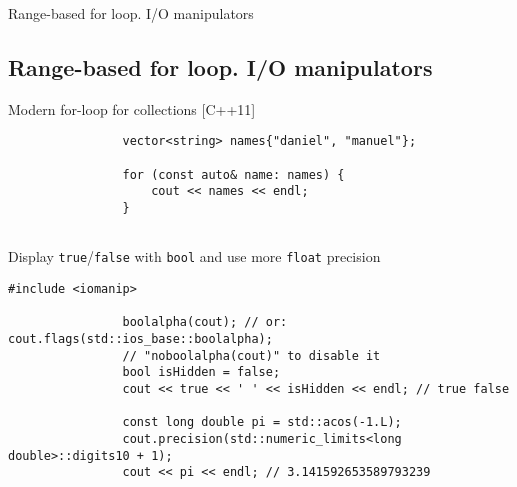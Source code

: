 \documentclass{beamer}
\newcommand{\normalSizeItem}[1] {
  \normalsize{\item #1}
}
\begin{document}
		\begin{frame}[fragile]{Range-based for loop. I/O manipulators}	
			\subsection{Range-based for loop. I/O manipulators}		
			\begin{itemize}
			
				\normalSizeItem { Modern for-loop for collections [C++11] }
				\begin{lstlisting}
				vector<string> names{"daniel", "manuel"};
				
				for (const auto& name: names) {
					cout << names << endl;
				}
				
				\end{lstlisting}
				
				\normalSizeItem { Display \texttt{true}/\texttt{false} with \texttt{bool} and use more \texttt{float} precision }
				\begin{lstlisting}[basicstyle={\tiny\ttfamily}]
				#include <iomanip>
				
				boolalpha(cout); // or: cout.flags(std::ios_base::boolalpha);
				// "noboolalpha(cout)" to disable it
				bool isHidden = false;
				cout << true << ' ' << isHidden << endl; // true false
				
				const long double pi = std::acos(-1.L);
				cout.precision(std::numeric_limits<long double>::digits10 + 1);
				cout << pi << endl; // 3.141592653589793239
				\end{lstlisting}
				
			\end{itemize}
		\end{frame}
		
\end{document}
